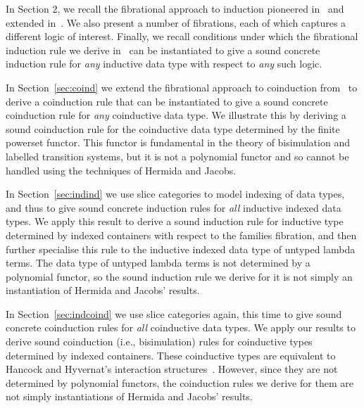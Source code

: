 \documentclass{LMCS}
\theoremstyle{plain}
\theoremstyle{remark}
\theoremstyle{definition}
\begin{document}
\begin{iteMize}{}

\item In Section 2, we recall the fibrational approach to induction
  pioneered in~\cite{hj98} and extended in~\cite{gjf10}. We also
  present a number of fibrations, each of which captures a different
  logic of interest. Finally, we recall conditions under which the
  fibrational induction rule we derive in~\cite{gjf10} can be
  instantiated to give a sound concrete induction rule for {\em any}
  inductive data type with respect to {\em any} such logic.

\item In Section~\ref{sec:coind} we extend the fibrational approach to
  coinduction from~\cite{hj98} to derive a coinduction rule that can
  be instantiated to give a sound concrete coinduction rule for {\em
    any} coinductive data type. We illustrate this by deriving a sound
  coinduction rule for the coinductive data type determined by the
  finite powerset functor. This functor is fundamental in the theory
  of bisimulation and labelled transition systems, but it is not a
  polynomial functor and so cannot be handled using the techniques of
  Hermida and Jacobs.

\item In Section~\ref{sec:indind} we use slice categories to model
  indexing of data types, and thus to give sound concrete induction
  rules for {\em all} inductive indexed data types. We apply this
  result to derive a sound induction rule for inductive type
  determined by indexed containers with respect to the families
  fibration, and then further specialise this rule to the inductive
  indexed data type of untyped lambda terms. The data type of untyped
  lambda terms is not determined by a polynomial functor, so the sound
  induction rule we derive for it is not simply an instantiation of
  Hermida and Jacobs' results.

\item In Section~\ref{sec:indcoind} we use slice categories again,
  this time to give sound concrete coinduction rules for {\em all}
  coinductive data types. We apply our results to derive sound
  coinduction (i.e., bisimulation) rules for coinductive types
  determined by indexed containers. These coinductive types are
  equivalent to Hancock and Hyvernat's interaction
  structures~\cite{hh06}. However, since they are not determined by
  polynomial functors, the coinduction rules we derive for them are
  not simply instantiations of Hermida and Jacobs' results.


\end{iteMize}
\end{document}
